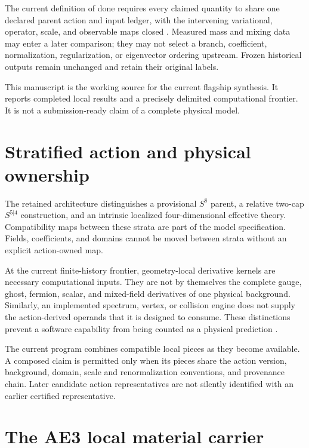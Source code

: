 \documentclass[11pt]{article}
\begin{document}
The current definition of done requires every claimed quantity to share one
declared parent action and input ledger, with the intervening variational,
operator, scale, and observable maps closed \cite{status,dod}. Measured mass
and mixing data may enter a later comparison; they may not select a branch,
coefficient, normalization, regularization, or eigenvector ordering upstream.
Frozen historical outputs remain unchanged and retain their original labels.

This manuscript is the working source for the current flagship synthesis.
It reports completed local results and a precisely delimited computational
frontier. It is not a submission-ready claim of a complete physical model.

\section{Stratified action and physical ownership}
The retained architecture distinguishes a provisional \(S^8\) parent,
a relative two-cap \(S^{5|4}\) construction, and an intrinsic localized
four-dimensional effective theory. Compatibility maps between these strata
are part of the model specification. Fields, coefficients, and domains
cannot be moved between strata without an explicit action-owned map.

At the current finite-history frontier, geometry-local derivative kernels
are necessary computational inputs. They are not by themselves the complete
gauge, ghost, fermion, scalar, and mixed-field derivatives of one physical
background. Similarly, an implemented spectrum, vertex, or collision engine
does not supply the action-derived operands that it is designed to consume.
These distinctions prevent a software capability from being counted as a
physical prediction \cite{status,dod}.

The current program combines compatible local pieces as they become
available. A composed claim is permitted only when its pieces share the
action version, background, domain, scale and renormalization conventions,
and provenance chain. Later candidate action representatives are not
silently identified with an earlier certified representative.

\section{The AE3 local material carrier}
\end{document}
